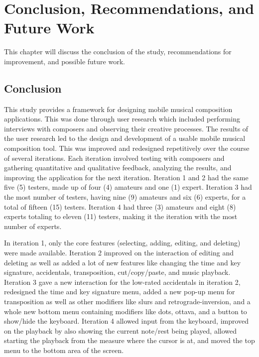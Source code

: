 
\chapter{Conclusion, Recommendations, and Future Work}

	This chapter will discuss the conclusion of the study, recommendations for improvement, and possible future work.

	\section{Conclusion}

		This study provides a framework for designing mobile musical composition applications. This was done through user research which included performing interviews with composers and observing their creative processes. The results of the user research led to the design and development of a usable mobile musical composition tool. This was improved and redesigned repetitively over the course of several iterations. Each iteration involved testing with composers and gathering quantitative and qualitative feedback, analyzing the results, and improving the application for the next iteration. Iteration 1 and 2 had the same five (5) testers, made up of four (4) amateurs and one (1) expert. Iteration 3 had the most number of testers, having nine (9) amateurs and six (6) experts, for a total of fifteen (15) testers. Iteration 4 had three (3) amateurs and eight (8) experts totaling to eleven (11) testers, making it the iteration with the most number of experts. 

		In iteration 1, only the core features (selecting, adding, editing, and deleting) were made available. Iteration 2 improved on the interaction of editing and deleting as well as added a lot of new features like changing the time and key signature, accidentals, transposition, cut/copy/paste, and music playback. Iteration 3 gave a new interaction for the low-rated accidentals in iteration 2, redesigned the time and key signature menu, added a new pop-up menu for transposition as well as other modifiers like slurs and retrograde-inversion, and a whole new bottom menu containing modifiers like dots, ottava, and a button to show/hide the keyboard. Iteration 4 allowed input from the keyboard, improved on the playback by also showing the current note/rest being played, allowed starting the playback from the measure where the cursor is at, and moved the top menu to the bottom area of the screen.

